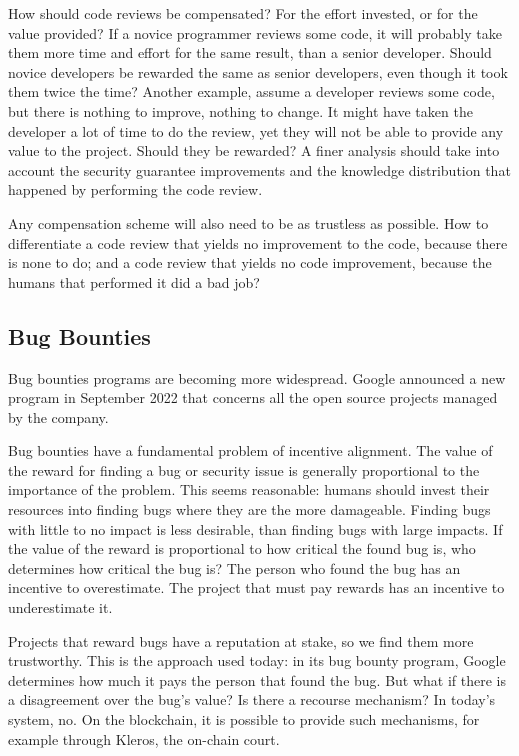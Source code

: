 How should code reviews be compensated?
For the effort invested, or for the value provided?
If a novice programmer reviews some code, it will probably take them more time and effort for the same result, than a senior developer.
Should novice developers be rewarded the same as senior developers, even though it took them twice the time?
Another example, assume a developer reviews some code, but there is nothing to improve, nothing to change.
It might have taken the developer a lot of time to do the review, yet they will not be able to provide any value to the project.
Should they be rewarded?
A finer analysis should take into account the security guarantee improvements and the knowledge distribution that happened by performing the code review.

Any compensation scheme will also need to be as trustless as possible.
How to differentiate a code review that yields no improvement to the code, because there is none to do; and a code review that yields no code improvement, because the humans that performed it did a bad job?

\subsection{Bug Bounties}

Bug bounties programs are becoming more widespread.
Google announced a new program in September 2022 that concerns all the open source projects managed by the company.

Bug bounties have a fundamental problem of incentive alignment.
The value of the reward for finding a bug or security issue is generally proportional to the importance of the problem.
This seems reasonable: humans should invest their resources into finding bugs where they are the more damageable.
Finding bugs with little to no impact is less desirable, than finding bugs with large impacts.
If the value of the reward is proportional to how critical the found bug is, who determines how critical the bug is?
The person who found the bug has an incentive to overestimate.
The project that must pay rewards has an incentive to underestimate it.

Projects that reward bugs have a reputation at stake, so we find them more trustworthy.
This is the approach used today: in its bug bounty program, Google determines how much it pays the person that found the bug.
But what if there is a disagreement over the bug's value?
Is there a recourse mechanism?
In today's system, no.
On the blockchain, it is possible to provide such mechanisms, for example through Kleros, the on-chain court.

